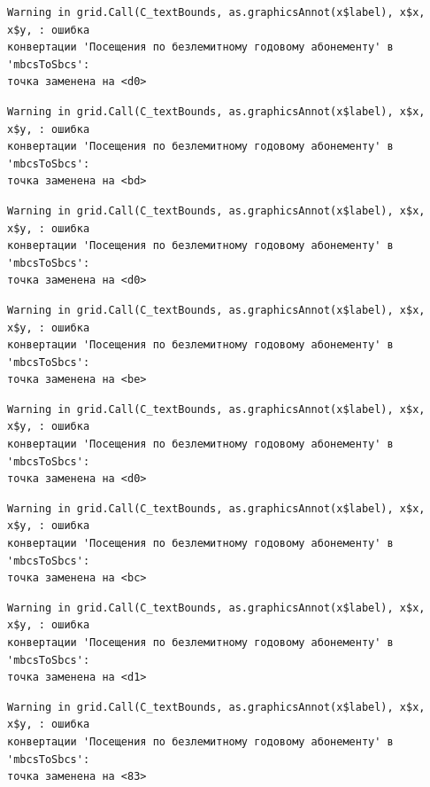 \documentclass[
  letterpaper,
  DIV=11,
  numbers=noendperiod]{scrreprt}
\begin{document}
\begin{verbatim}
Warning in grid.Call(C_textBounds, as.graphicsAnnot(x$label), x$x, x$y, : ошибка
конвертации 'Посещения по безлемитному годовому абонементу' в 'mbcsToSbcs':
точка заменена на <d0>
\end{verbatim}

\begin{verbatim}
Warning in grid.Call(C_textBounds, as.graphicsAnnot(x$label), x$x, x$y, : ошибка
конвертации 'Посещения по безлемитному годовому абонементу' в 'mbcsToSbcs':
точка заменена на <bd>
\end{verbatim}

\begin{verbatim}
Warning in grid.Call(C_textBounds, as.graphicsAnnot(x$label), x$x, x$y, : ошибка
конвертации 'Посещения по безлемитному годовому абонементу' в 'mbcsToSbcs':
точка заменена на <d0>
\end{verbatim}

\begin{verbatim}
Warning in grid.Call(C_textBounds, as.graphicsAnnot(x$label), x$x, x$y, : ошибка
конвертации 'Посещения по безлемитному годовому абонементу' в 'mbcsToSbcs':
точка заменена на <be>
\end{verbatim}

\begin{verbatim}
Warning in grid.Call(C_textBounds, as.graphicsAnnot(x$label), x$x, x$y, : ошибка
конвертации 'Посещения по безлемитному годовому абонементу' в 'mbcsToSbcs':
точка заменена на <d0>
\end{verbatim}

\begin{verbatim}
Warning in grid.Call(C_textBounds, as.graphicsAnnot(x$label), x$x, x$y, : ошибка
конвертации 'Посещения по безлемитному годовому абонементу' в 'mbcsToSbcs':
точка заменена на <bc>
\end{verbatim}

\begin{verbatim}
Warning in grid.Call(C_textBounds, as.graphicsAnnot(x$label), x$x, x$y, : ошибка
конвертации 'Посещения по безлемитному годовому абонементу' в 'mbcsToSbcs':
точка заменена на <d1>
\end{verbatim}

\begin{verbatim}
Warning in grid.Call(C_textBounds, as.graphicsAnnot(x$label), x$x, x$y, : ошибка
конвертации 'Посещения по безлемитному годовому абонементу' в 'mbcsToSbcs':
точка заменена на <83>
\end{verbatim}
\end{document}
